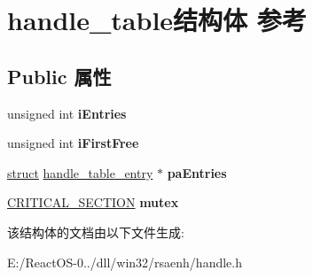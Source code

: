 \hypertarget{structhandle__table}{}\section{handle\+\_\+table结构体 参考}
\label{structhandle__table}
\subsection*{Public 属性}
\begin{DoxyCompactItemize}
\item 
\mbox{\label{structhandle__table_ad56705e8db119007beb53cb577bcfdd1}} 
unsigned int {\bfseries i\+Entries}
\item 
\mbox{\label{structhandle__table_aa55578ac1d2f1985fe64530fa60c5677}} 
unsigned int {\bfseries i\+First\+Free}
\item 
\mbox{\label{structhandle__table_abfaf94eb5707c9b84b42fae5f41fc11b}} 
\hyperlink{interfacestruct}{struct} \hyperlink{structhandle__table__entry}{handle\+\_\+table\+\_\+entry} $\ast$ {\bfseries pa\+Entries}
\item 
\mbox{\label{structhandle__table_a35549aa15815369dfaaa22657c16c9d1}} 
\hyperlink{struct___c_r_i_t_i_c_a_l___s_e_c_t_i_o_n}{C\+R\+I\+T\+I\+C\+A\+L\+\_\+\+S\+E\+C\+T\+I\+ON} {\bfseries mutex}
\end{DoxyCompactItemize}


该结构体的文档由以下文件生成\+:\begin{DoxyCompactItemize}
\item 
E\+:/\+React\+O\+S-\/0../dll/win32/rsaenh/handle.\+h\end{DoxyCompactItemize}
